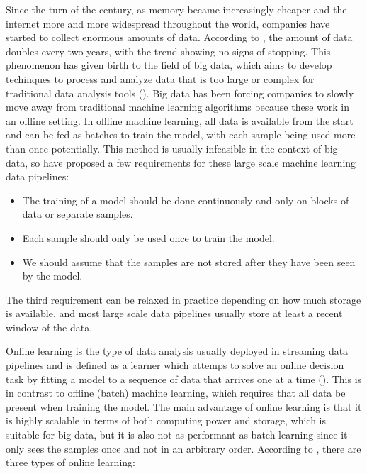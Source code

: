 \documentclass[12pt]{extreport}
\begin{document}
Since the turn of the century, as memory became increasingly cheaper and the internet more and more widespread throughout the world, companies have started to collect enormous amounts of data. According to \cite{big-data-beginning-future}, the amount of data doubles every two years, with the trend showing no signs of stopping. This phenomenon has given birth to the field of big data, which aims to develop techinques to process and analyze data that is too large or complex for traditional data analysis tools (\cite{wiki:big-data}). Big data has been forcing companies to slowly move away from traditional machine learning algorithms because these work in an offline setting. In offline machine learning, all data is available from the start and can be fed as batches to train the model, with each sample being used more than once potentially. This method is usually infeasible in the context of big data, so \cite{advances-knowledge-discovery} have proposed a few requirements for these large scale machine learning data pipelines:

\begin{itemize}
    \item The training of a model should be done continuously and only on blocks of data or separate samples.
    \item Each sample should only be used once to train the model.
    \item We should assume that the samples are not stored after they have been seen by the model.
\end{itemize}

The third requirement can be relaxed in practice depending on how much storage is available, and most large scale data pipelines usually store at least a recent window of the data.

Online learning is the type of data analysis usually deployed in streaming data pipelines and is defined as a learner which attemps to solve an online decision task by fitting a model to a sequence of data that arrives one at a time (\cite{onlinelearning}). This is in contrast to offline (batch) machine learning, which requires that all data be present when training the model. The main advantage of online learning is that it is highly scalable in terms of both computing power and storage, which is suitable for big data, but it is also not as performant as batch learning since it only sees the samples once and not in an arbitrary order. According to \cite{onlinelearning}, there are three types of online learning:
\end{document}
